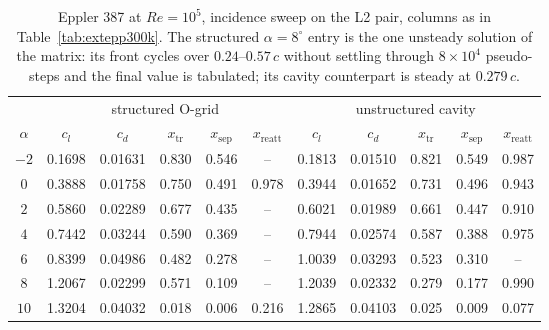 \begin{table}[tp]
  \centering\small
  \caption{Eppler 387 at $Re\!=\!10^5$, incidence sweep on the L2 pair, columns as in Table~\ref{tab:extepp300k}. The structured $\alpha\!=\!8^\circ$ entry is the one unsteady solution of the matrix: its front cycles over $0.24$--$0.57\,c$ without settling through $8\!\times\!10^4$ pseudo-steps and the final value is tabulated; its cavity counterpart is steady at $0.279\,c$.}
  \label{tab:extepp100k}
  \begin{tabular}{c ccccc ccccc}
    \toprule
    & \multicolumn{5}{c}{structured O-grid} & \multicolumn{5}{c}{unstructured cavity} \\
    \cmidrule(lr){2-6}\cmidrule(lr){7-11}
    $\alpha$ & $c_l$ & $c_d$ & $x_\mathrm{tr}$ & $x_\mathrm{sep}$ & $x_\mathrm{reatt}$
             & $c_l$ & $c_d$ & $x_\mathrm{tr}$ & $x_\mathrm{sep}$ & $x_\mathrm{reatt}$ \\
    \midrule
    $-2$ & 0.1698 & 0.01631 & 0.830 & 0.546 & -- & 0.1813 & 0.01510 & 0.821 & 0.549 & 0.987 \\
    $0$ & 0.3888 & 0.01758 & 0.750 & 0.491 & 0.978 & 0.3944 & 0.01652 & 0.731 & 0.496 & 0.943 \\
    $2$ & 0.5860 & 0.02289 & 0.677 & 0.435 & -- & 0.6021 & 0.01989 & 0.661 & 0.447 & 0.910 \\
    $4$ & 0.7442 & 0.03244 & 0.590 & 0.369 & -- & 0.7944 & 0.02574 & 0.587 & 0.388 & 0.975 \\
    $6$ & 0.8399 & 0.04986 & 0.482 & 0.278 & -- & 1.0039 & 0.03293 & 0.523 & 0.310 & -- \\
    $8$ & 1.2067 & 0.02299 & 0.571 & 0.109 & -- & 1.2039 & 0.02332 & 0.279 & 0.177 & 0.990 \\
    $10$ & 1.3204 & 0.04032 & 0.018 & 0.006 & 0.216 & 1.2865 & 0.04103 & 0.025 & 0.009 & 0.077 \\
    \bottomrule
  \end{tabular}
\end{table}
